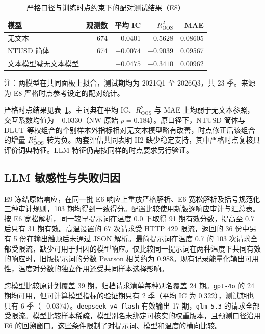 \begin{table}[htbp]
  \centering\small
  \caption{严格口径与训练时点约束下的配对测试结果（E8）}\label{tab:strict-oos}
  \begin{tabular}{lrrrr}
    \toprule
    模型 & 观测数 & 平均 IC & $R^2_{\mathrm{OOS}}$ & MAE \\
    \midrule
    无文本 & 674 & 0.0401 & $-0.5628$ & 0.08605 \\
    NTUSD 简体 & 674 & $-0.0074$ & $-0.9039$ & 0.09567 \\
    文本模型减无文本模型 & & $-0.0475$ & $-0.3410$ & 0.00962 \\
    \bottomrule
  \end{tabular}
  \par\smallskip
  \parbox{0.88\linewidth}{\footnotesize 注：两模型在共同面板上拟合，测试期均为 2021Q1 至 2026Q3，共 23 季。来源为 E8 严格时点参考设定的配对统计。}
\end{table}

严格时点结果见表~\ref{tab:strict-oos}。主词典在平均 IC、$R^2_{\mathrm{OOS}}$ 与 MAE 上均弱于无文本参照，交互系数均值为 $-0.0330$（NW 原始 $p=0.184$）。原口径下，NTUSD 简体与 DLUT 等权组合的个别样本外指标相对无文本模型略有改善，时点修正后该组合的增量 $R^2_{\mathrm{OOS}}$ 转为负。两套评估共同表明 H2 缺少稳定支持，其中严格时点复核只评价词典特征。LLM 特征仍需按同样的时点要求另行验证。

\subsection{LLM 敏感性与失败归因}

E9 冻结原始响应，在同一批 E6 响应上重放严格解析、E6 宽松解析及括号规范化三种审计规则，103 期均得到一致得分。配置比较使用新版逐响应审计与汇总表。按 E6 宽松解析，同一较早提示词在温度 0.0 下取得 91 期有效分数，提高至 0.7 后只有 31 期有效。高温设置的 67 次请求受 HTTP 429 限流，返回的 36 份中另有 5 份在输出触顶后未通过 JSON 解析。最简提示词在温度 0.7 的 103 次请求全部受限流，缺少可用于归因的模型响应。仅比较同一提示词在两种温度下共同有效的响应时，旧版提示词的分数 Pearson 相关约为 0.988。现有记录能量化输出可用性，温度对分数的独立作用还受共同样本选择影响。

跨模型比较原计划覆盖 39 期，归档请求清单每种别名覆盖 24 期。\texttt{gpt-4o} 的 24 期均可用，但可计算模型指标的验证期只有 2 季（平均 IC 为 0.322），测试期也只有 6 季（$-0.0374$）。\texttt{deepseek-v4-flash} 有效输出 17 期，\texttt{glm-5.3} 的请求全部受限流。模型比较样本稀疏，模型别名未绑定可核实的权重版本，且预测口径沿用 E6 的回溯窗口。这些条件限制了对提示词、模型和温度的横向比较。

